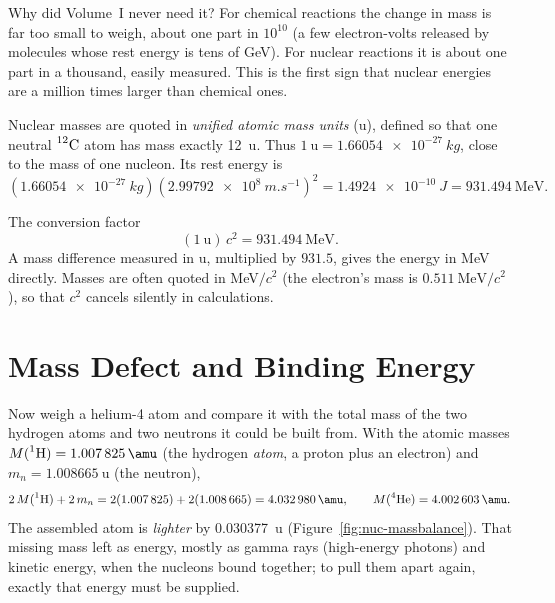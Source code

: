 Why did Volume~I never need it? For chemical reactions the change in mass is far too small to weigh, about
one part in $10^{10}$ (a few electron-volts released by molecules whose rest energy is tens of
\si{\giga\electronvolt}). For nuclear reactions it is about one part in a thousand, easily measured. This
is the first sign that nuclear energies are a million times larger than chemical ones.

Nuclear masses are quoted in \emph{unified atomic mass units} (\si{\amu}), defined so that one neutral
$\prescript{12}{}{\mathrm{C}}$ atom has mass exactly \SI{12}{\amu}. Thus $\SI{1}{\amu}=\SI{1.66054e-27}{kg}$, close to the
mass of one nucleon. Its rest energy is
\[
(\SI{1.66054e-27}{kg})(\SI{2.99792e8}{m.s^{-1}})^2=\SI{1.4924e-10}{J}=\SI{931.494}{\MeV}.
\]
\begin{keybox}{The conversion factor}
\[
(\SI{1}{\amu})\,c^2=\SI{931.494}{\MeV}.
\]
A mass difference measured in \si{\amu}, multiplied by $931.5$, gives the energy in \si{\MeV} directly.
Masses are often quoted in \si{\MeV}$/c^2$ (the electron's mass is $\SI{0.511}{\MeV}/c^2$), so that $c^2$
cancels silently in calculations.
\end{keybox}

\section{Mass Defect and Binding Energy}\label{sec:nuc-binding}

Now weigh a helium-4 atom and compare it with the total mass of the two hydrogen atoms and two
neutrons it could be built from. With the atomic masses $M(\iso{1}{H})=\SI{1.007825}{\amu}$ (the hydrogen
\emph{atom}, a proton plus an electron) and $m_n=\SI{1.008665}{\amu}$ (the neutron),
\[
2\,M(\iso{1}{H})+2\,m_n=2(1.007\,825)+2(1.008\,665)=\SI{4.032980}{\amu},\qquad
M(\iso{4}{He})=\SI{4.002603}{\amu}.
\]
The assembled atom is \emph{lighter} by \SI{0.030377}{\amu} (Figure~\ref{fig:nuc-massbalance}). That
missing mass left as energy, mostly as gamma rays (high-energy photons) and kinetic energy, when the
nucleons bound together; to pull them apart again, exactly that energy must be supplied.

\begin{figure}[htbp]
\centering
{}
\end{figure}

